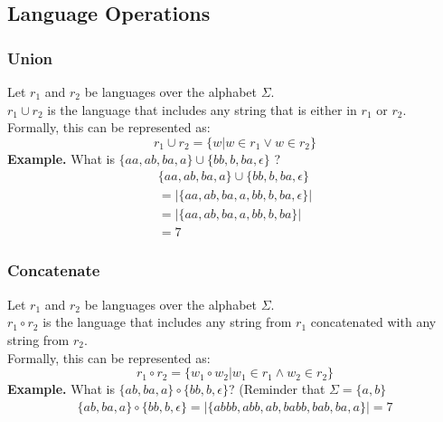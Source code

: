 \documentclass[a4paper, 12pt, margin=1.2in]{article}
\begin{document}
\subsection{Language Operations}
\subsubsection{Union}
Let $r_1$ and $r_2$ be languages over the alphabet $\Sigma$. \\
$r_1 \cup r_2$ is the language that includes any string that is either in $r_1$ or $r_2$.\\
Formally, this can be represented as:
\[
    r_1 \cup r_2 = \{ w | w \in r_1 \lor w \in r_2\}
\]
\textbf{Example.} What is $\{aa, ab, ba, a\} \cup \{bb, b, ba, \epsilon\}$ ?
\begin{align*}
    \{aa, ab, ba, a\} \cup \{bb, b, ba, \epsilon\} \\
    = |\{aa, ab, ba, a, bb, b, ba, \epsilon\}| \\
    = |\{aa, ab, ba, a, bb, b, ba\}|\\
    = 7
\end{align*}
\subsubsection{Concatenate}
Let $r_1$ and $r_2$ be languages over the alphabet $\Sigma$. \\
$r_1 \circ r_2$ is the language that includes any string from $r_1$ concatenated with any string from $r_2$.\\
Formally, this can be represented as:
\[
    r_1 \circ r_2 = \{w_1 \circ w_2 | w_1 \in r_1 \land w_2 \in r_2\}
\]
\textbf{Example.} What is $\{ab, ba, a\} \circ \{bb, b, \epsilon\}$? (Reminder that $\Sigma = \{a, b\}$
\begin{align*}
    \{ab, ba, a\} \circ \{bb, b, \epsilon\}
    = |\{abbb, abb, ab, babb, bab, ba, a\}|
    = 7
\end{align*}
\end{document}
